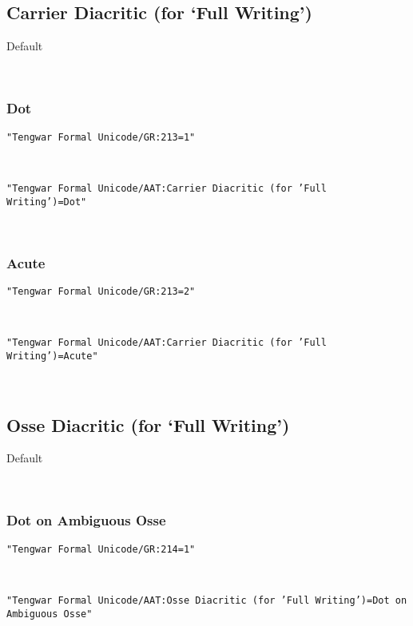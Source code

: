 \documentclass[11pt,a4paper]{article}
\begin{document}
\subsection{Carrier Diacritic (for ‘Full Writing’)}


Default

\formalGR  



\subsubsection*{Dot}


\texttt{"Tengwar Formal Unicode/GR:213=1"}

\formalGRcarrierdot  

\noindent \texttt{"Tengwar Formal Unicode/AAT:Carrier Diacritic (for 'Full Writing')=Dot"}

\formalAATcarrierdot   



\subsubsection*{Acute}


\texttt{"Tengwar Formal Unicode/GR:213=2"}

\formalGRcarrieracute  

\noindent \texttt{"Tengwar Formal Unicode/AAT:Carrier Diacritic (for 'Full Writing')=Acute"}

\formalAATcarrieracute   \normalfont



\subsection{Osse Diacritic (for ‘Full Writing’)}


Default

\formalGR  



\subsubsection*{Dot on Ambiguous Osse}


\texttt{"Tengwar Formal Unicode/GR:214=1"}

\formalGRosseambiguous  

\noindent \texttt{"Tengwar Formal Unicode/AAT:Osse Diacritic (for 'Full Writing')=Dot on Ambiguous Osse"}
\end{document}

